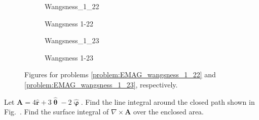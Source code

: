 \documentclass[crop=false,class=book,oneside]{standalone}
\begin{document}
            \begin{figure}[H]
                \centering
                \captionsetup{type=figure}
                \begin{subfigure}[b]{0.49\textwidth}
                    \centering
                    \captionsetup{type=figure}
                    {Wangsness_1_22}
                    \caption{Wangsness 1-22}
                    \label{fig:EMAG_1_wangsness_1_22}
                \end{subfigure}
                \begin{subfigure}[b]{0.49\textwidth}
                    \centering
                    \captionsetup{type=figure}
                    {Wangsness_1_23}
                    \caption{Wangsness 1-23}
                    \label{fig:EMAG_1_wangsness_1_23}
                \end{subfigure}
                \caption[Figures for Wangsness 1-22 and 1-23]{%
                    Figures for problems \ref{problem:EMAG_wangsness_1_22}
                    and \ref{problem:EMAG_wangsness_1_23}, respectively.
                }
            \end{figure}
            \begin{problem}[Wangsness 1-23]
                \label{problem:EMAG_wangsness_1_23}
                Let $\mathbf{A}=4\hat{\mathbf{r}}+3\hat{\boldsymbol{\uptheta}}
                -2\hat{\boldsymbol{\upvarphi}}$. Find the line integral
                around the closed path shown in
                Fig.~.
                Find the surface integral of
                $\nabla \times \mathbf{A}$ over the enclosed area.
            \end{problem}
\end{document}
